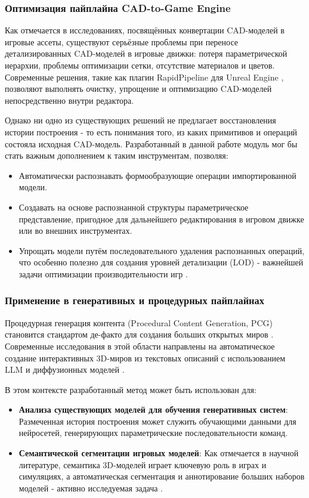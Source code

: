 \subsubsection{Оптимизация пайплайна CAD-to-Game Engine}

Как отмечается в исследованиях, посвящённых конвертации CAD-моделей в игровые ассеты, существуют серьёзные проблемы при переносе детализированных CAD-моделей в игровые движки: потеря параметрической иерархии, проблемы оптимизации сетки, отсутствие материалов и цветов. Современные решения, такие как плагин RapidPipeline для Unreal Engine \cite{rapidPipeline}, позволяют выполнять очистку, упрощение и оптимизацию CAD-моделей непосредственно внутри редактора.

Однако ни одно из существующих решений не предлагает восстановления истории построения - то есть понимания того, из каких примитивов и операций состояла исходная CAD-модель. Разработанный в данной работе модуль мог бы стать важным дополнением к таким инструментам, позволяя:
\begin{itemize}
    \item Автоматически распознавать формообразующие операции импортированной модели.
    \item Создавать на основе распознанной структуры параметрическое представление, пригодное для дальнейшего редактирования в игровом движке или во внешних инструментах.
    \item Упрощать модели путём последовательного удаления распознанных операций, что особенно полезно для создания уровней детализации (LOD) - важнейшей задачи оптимизации производительности игр \cite{lodWikipedia}.
\end{itemize}

\subsubsection{Применение в генеративных и процедурных пайплайнах}

Процедурная генерация контента (Procedural Content Generation, PCG) становится стандартом де-факто для создания больших открытых миров \cite{pcgTechniques}. Современные исследования в этой области направлены на автоматическое создание интерактивных 3D-миров из текстовых описаний с использованием LLM и диффузионных моделей \cite{llmWorlds}.

В этом контексте разработанный метод может быть использован для:
\begin{itemize}
    \item \textbf{Анализа существующих моделей для обучения генеративных систем}: Размеченная история построения может служить обучающими данными для нейросетей, генерирующих параметрические последовательности команд.
    \item \textbf{Семантической сегментации игровых моделей}: Как отмечается в научной литературе, семантика 3D-моделей играет ключевую роль в играх и симуляциях, а автоматическая сегментация и аннотирование больших наборов моделей - активно исследуемая задача \cite{scitepressSegmentation}.
\end{itemize}

